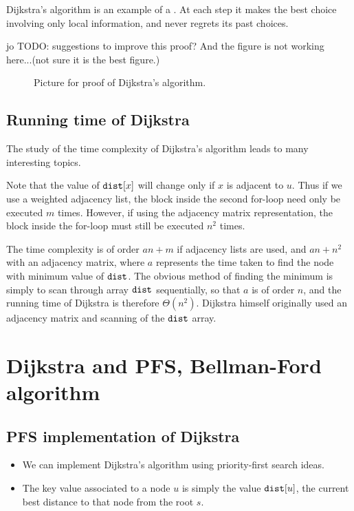 Dijkstra's algorithm is an example of a . 
At each step it makes the best choice involving only local information,
and never regrets its past choices. 

jo TODO: suggestions to improve this proof? And the figure is not working here...(not sure it is the best figure.)

\begin{figure}
\caption{Picture for proof of Dijkstra's algorithm.}
\label{fig:dijk-proof2}
\end{figure}

\section{Running time of Dijkstra}

The study of the time complexity of Dijkstra's algorithm leads to many
interesting topics.

Note that the value of $\dist[x]$ will change only if $x$ is adjacent to
$u$. Thus if we use a weighted adjacency list, the block inside the
second for-loop need only be executed $m$ times. However, if
using the adjacency matrix representation, the block inside the for-loop
must still be executed $n^2$ times.

The time complexity is of order $a n + m$ if adjacency lists are used,
and $a n + n^2$ with an adjacency matrix, where $a$ represents the time
taken to find the node with minimum value of $\dist$. The obvious method
of finding the minimum is simply to scan through array $\dist$
sequentially, so that $a$ is of order $n$, and the running time of
Dijkstra is therefore $\Theta(n^2)$. Dijkstra himself originally used
an adjacency matrix and scanning of the $\dist$ array. 


\chapter{Dijkstra and PFS, Bellman-Ford algorithm}

\section{PFS implementation of Dijkstra}
\begin{itemize}
\item We can implement Dijkstra's algorithm using priority-first search ideas. 
\item The key value associated to a node $u$ is simply the
value $\dist[u]$, the current best distance to that node from the root $s$.
\end{itemize}


